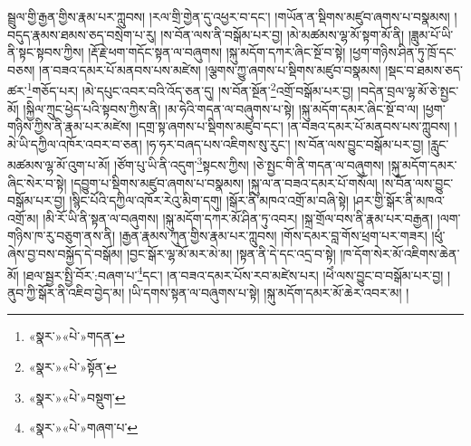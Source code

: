 སྦྲུལ་གྱི་རྒྱན་གྱིས་རྣམ་པར་ཀླུབས། །རལ་གྲི་གྱེན་དུ་འཕྱར་བ་དང་། །གཡོན་ན་སྡིགས་མཛུབ་ཞགས་པ་བསྣམས། །བདུད་རྣམས་ཐམས་ཅད་བསྲེག་པ་རུ། །ས་བོན་ལས་ནི་བསྒོམ་པར་བྱ། །མེ་མཚམས་ལྷ་མོ་སྟག་མོ་ནི། །ཟླུམ་པོ་ཡི་ནི་སྟང་སྟབས་ཀྱིས། །རྡོ་རྗེ་ཕག་གདོང་སྟན་ལ་བཞུགས། །སྐུ་མདོག་དཀར་ཞིང་སྔོ་བ་སྟེ། །ཕྱག་གཉིས་ཤིན་ཏུ་ཁྲོ་དང་བཅས། །ན་བཟའ་དམར་པོ་མནབས་པས་མཛེས། །ལྕགས་ཀྱུ་ཞགས་པ་སྡིགས་མཛུབ་བསྣམས། །སྡང་བ་ཐམས་ཅད་ཚར་\footnote{«སྣར་»«པེ་»གདན་}གཅོད་པར། །མེ་དཔུང་འབར་བའི་འོད་ཅན་དུ། །ས་བོན་སྔོན་\footnote{«སྣར་»«པེ་»སྟོན་}འགྲོ་བསྒོམ་པར་བྱ། །བདེན་བྲལ་ལྷ་མོ་ཅེ་སྤྱང་མོ། །སྐྱིལ་ཀྲུང་ཕྱེད་པའི་སྟབས་ཀྱིས་ནི། །མ་ཧེའི་གདན་ལ་བཞུགས་པ་སྟེ། །སྐུ་མདོག་དམར་ཞིང་སྔོ་བ་ལ། །ཕྱག་གཉིས་ཀྱིས་ནི་རྣམ་པར་མཛེས། །དགྲ་སྟ་ཞགས་པ་སྡིགས་མཛུབ་དང་། །ན་བཟའ་དམར་པོ་མནབས་པས་ཀླུབས། །མེ་ཡི་དཀྱིལ་འཁོར་འབར་བ་ཅན། །ཧ་ཧར་བཞད་པས་འཇིགས་སུ་རུང་། །ས་བོན་ལས་བྱུང་བསྒོམ་པར་བྱ། །རླུང་མཚམས་ལྷ་མོ་འུག་པ་མོ། །ཙོག་པུ་ཡི་ནི་འདུག་\footnote{«སྣར་»«པེ་»བསྡུག་}སྟངས་ཀྱིས། །ཅེ་སྤྱང་གི་ནི་གདན་ལ་བཞུགས། །སྐུ་མདོག་དམར་ཞིང་སེར་བ་སྟེ། །དབྱུག་པ་སྡིགས་མཛུབ་ཞགས་པ་བསྣམས། །སྐུ་ལ་ན་བཟའ་དམར་པོ་གསོལ། །ས་བོན་ལས་བྱུང་བསྒོམ་པར་བྱ། །སྙིང་པོའི་དཀྱིལ་འཁོར་རེའུ་མིག་དགུ། །སྒོར་ནི་མཁའ་འགྲོ་མ་བཞི་སྟེ། །ཤར་གྱི་སྒོར་ནི་མཁའ་འགྲོ་མ། །མི་རོ་ཡི་ནི་སྟན་ལ་བཞུགས། །སྐུ་མདོག་དཀར་མོ་ཤིན་ཏུ་འབར། །སྐྲ་གྲོལ་བས་ནི་རྣམ་པར་བརྒྱན། །ལག་གཉིས་ཁ་རུ་བཅུག་ནས་ནི། །རྒྱན་རྣམས་ཀུན་གྱིས་རྣམ་པར་ཀླུབས། །གོས་དམར་བླ་གོས་ཕྲག་པར་གཟར། །ཕུཾ་ཞེས་བྱ་བས་བསྐྱོད་དེ་བསྒོམ། །བྱང་སྒོར་ལྷ་མོ་མར་མེ་མ། །སྟན་ནི་དེ་དང་འདྲ་བ་སྟེ། །ཁ་དོག་སེར་མོ་འཇིགས་ཆེན་མོ། །ཐལ་སྦྱར་སྤྱི་བོར་:བཞག་པ་\footnote{«སྣར་»«པེ་»གཞག་པ་}དང་། །ན་བཟའ་དམར་པོས་རབ་མཛེས་པར། །ཕེཾ་ལས་བྱུང་བ་བསྒོམ་པར་བྱ། །ནུབ་ཀྱི་སྒོར་ནི་འཇིབ་བྱེད་མ། །ཡི་དགས་སྟན་ལ་བཞུགས་པ་སྟེ། །སྐུ་མདོག་དམར་མོ་ཆེར་འབར་མ། །
